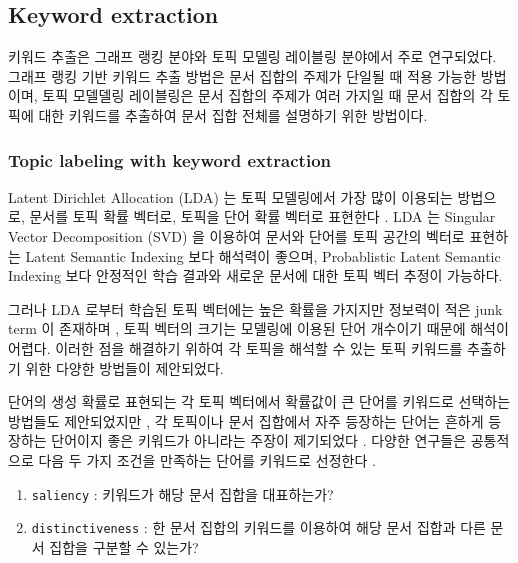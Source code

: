 \documentclass[11pt]{article}
\begin{document}
\subsection{Keyword extraction}

키워드 추출은 그래프 랭킹 분야와 토픽 모델링 레이블링 분야에서 주로 연구되었다.
그래프 랭킹 기반 키워드 추출 방법은 문서 집합의 주제가 단일될 때 적용 가능한 방법이며, 토픽 모델델링 레이블링은 문서 집합의 주제가 여러 가지일 때 문서 집합의 각 토픽에 대한 키워드를 추출하여 문서 집합 전체를 설명하기 위한 방법이다.

\subsubsection{Topic labeling with keyword extraction}

Latent Dirichlet Allocation (LDA) 는 토픽 모델링에서 가장 많이 이용되는 방법으로, 문서를 토픽 확률 벡터로, 토픽을 단어 확률 벡터로 표현한다 \citep{blei2003latent}.
LDA 는 Singular Vector Decomposition (SVD) 을 이용하여 문서와 단어를 토픽 공간의 벡터로 표현하는 Latent Semantic Indexing \citep{landauer1998introduction} 보다 해석력이 좋으며, Probablistic Latent Semantic Indexing \citep{hofmann1999probabilistic} 보다 안정적인 학습 결과와 새로운 문서에 대한 토픽 벡터 추정이 가능하다.

그러나 LDA 로부터 학습된 토픽 벡터에는 높은 확률을 가지지만 정보력이 적은 junk term 이 존재하며 \citep{newman2010evaluating}, 토픽 벡터의 크기는 모델링에 이용된 단어 개수이기 때문에 해석이 어렵다.
이러한 점을 해결하기 위하여 각 토픽을 해석할 수 있는 토픽 키워드를 추출하기 위한 다양한 방법들이 제안되었다. 

단어의 생성 확률로 표현되는 각 토픽 벡터에서 확률값이 큰 단어를 키워드로 선택하는 방법들도 제안되었지만 \citep{snyder2013topic, chuang2013topic, wallach2009evaluation}, 각 토픽이나 문서 집합에서 자주 등장하는 단어는 흔하게 등장하는 단어이지 좋은 키워드가 아니라는 주장이 제기되었다 \citep{ramage09tmsocial, newman2010evaluating, chuang2012interpretation}.
다양한 연구들은 공통적으로 다음 두 가지 조건을 만족하는 단어를 키워드로 선정한다 \citep{chuang2012termite}.

\begin{enumerate}
  \item \texttt{saliency} : 키워드가 해당 문서 집합을 대표하는가?
  \item \texttt{distinctiveness} : 한 문서 집합의 키워드를 이용하여 해당 문서 집합과 다른 문서 집합을 구분할 수 있는가?
\end{enumerate}
\end{document}
